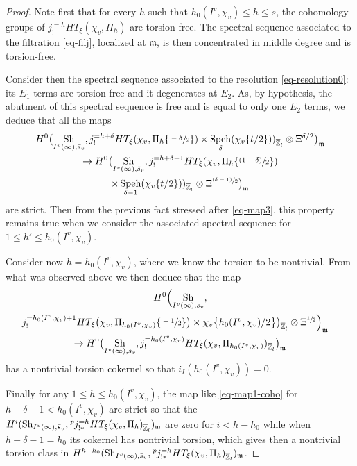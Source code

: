 \documentclass[JEP,XML,SOM,Unicode,published]{cedram}
\newcommand{\psfrac}[2]{\sfrac{(#1)}{#2}}
\theoremstyle{plain}
\theoremstyle{definition}
\numberwithin{equation}{subsection}
\newcommand\Zm{{\mathbb Z}}
\newcommand{\lexp}[2]{\kern \scriptspace \vphantom{#2}^{#1}\kern-\scriptspace#2}
\DeclareMathOperator{\sh}{Sh}
\DeclareMathOperator{\speh}{Speh}
\let \oo=\infty
\begin{document}
\begin{proof}
Note first that for every $h$ such that $h_0(I^v,\chi_v) \leq h \leq s$, the cohomology groups of
$j^{=h}_! HT_\xi(\chi_{v},\Pi_h)$ are torsion-free.
The spectral sequence associated to the filtration
\eqref{eq-filj}, localized at $\mathfrak m$, is then concentrated in
middle degree and is torsion-free.

Consider then the spectral sequence associated to the resolution \eqref{eq-resolution0}: its
$E_1$ terms are torsion-free and it degenerates at $E_2$.
As, by hypothesis, the abutment of this spectral sequence is free
and is equal to only one $E_2$ terms, we deduce that all the maps
\begin{multline} \label{eq-map1-coho0}
H^0 \bigl (\sh_{I^{v}(\oo),\bar s_v},j_!^{=h+\delta} HT_\xi(\chi_{v},\Pi_h \{\sfrac{-\delta}{2}\}) \times
\speh_{\delta} (\chi_{v}\{t/2\}))_{\overline \Zm_l} \otimes \Xi^{\delta/2} \bigr)_{\mathfrak m}\\
\to H^0 \bigl (\sh_{I^{v}(\oo),\bar s_v},
j_!^{=h+\delta-1} HT_\xi(\chi_{v},\Pi_h \{\psfrac{1-\delta}{2}\}) \\ \times
\speh_{\delta-1}(\chi_{v}\{t/2\}))_{\overline \Zm_l} \otimes \Xi^{\psfrac{\delta-1}{2}} \bigr)_{\mathfrak m}
\end{multline}
are strict. Then from the previous fact stressed after \eqref{eq-map3}, this property
remains true when we consider the associated spectral sequence for $1 \leq h' \leq h_0(I^v,\chi_v)$.

Consider now $h=h_0(I^v,\chi_v)$,
where we know the torsion to be nontrivial. From what was observed above
we then deduce that the map
\begin{multline} \label{eq-map1-coho}
H^0 \Bigl (\sh_{I^{v}(\oo),\bar s_v},\\
\shoveright{j_!^{=h_0(I^v,\chi_v)+1} HT_\xi\bigl(\chi_{v},\Pi_{h_0(I^v,\chi_v)} \{\sfrac{-1}{2}\}\bigr)
\times \chi_{v}\bigl\{h_0(I^v,\chi_v)/2\bigl\}\bigr)_{\overline \Zm_l} \otimes \Xi^{\sfrac{1}{2}} \Bigr)_{\mathfrak m}} \\
\to H^0 \bigl (\sh_{I^{v}(\oo),\bar s_v},
j_!^{=h_0(I^v,\chi_v)} HT_\xi(\chi_{v},\Pi_{h_0(I^v,\chi_v)})_{\overline \Zm_l} \bigr)_{\mathfrak m}
\end{multline}
has a nontrivial torsion cokernel so that $i_I(h_0(I^v,\chi_v))=0$.

Finally for any $1 \leq h \leq h_0(I^v,\chi_v)$, the map like \eqref{eq-map1-coho} for $h+\delta-1 < h_0(I^v,\chi_v)$
are strict so that the $H^i(\sh_{I^{v}(\oo),\bar s_v},\lexp p j^{=h}_{!*}
HT_\xi(\chi_{v},\Pi_h)_{\overline \Zm_l})_{\mathfrak m}$ are zero for $i < h-h_0$ while when
$h+\delta-1=h_0$ its cokernel has nontrivial torsion, which gives
then a nontrivial torsion class in $H^{h-h_0}(\sh_{I^{v}(\oo),\bar s_v},\lexp p j^{=h}_{!*}
HT_\xi(\chi_{v},\Pi_h)_{\overline \Zm_l})_{\mathfrak m}$.
\end{proof}
\end{document}
